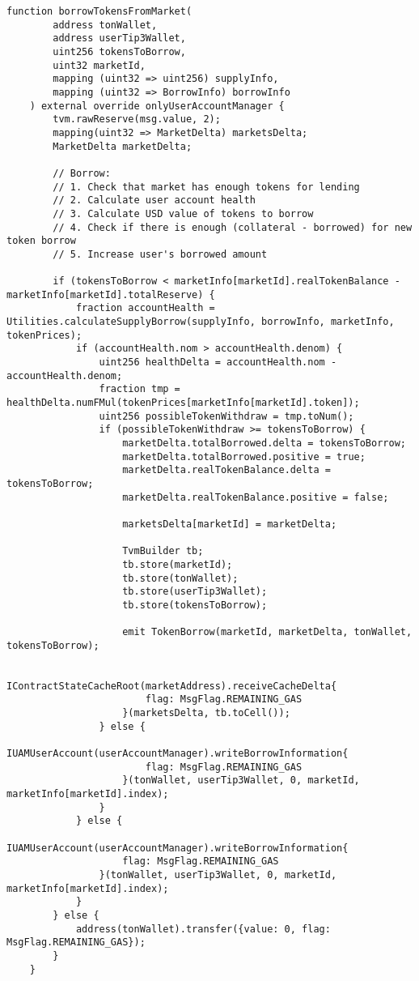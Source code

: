 \begin{lstlisting}[firstnumber=105]
    function borrowTokensFromMarket(
        address tonWallet,
        address userTip3Wallet,
        uint256 tokensToBorrow,
        uint32 marketId,
        mapping (uint32 => uint256) supplyInfo,
        mapping (uint32 => BorrowInfo) borrowInfo
    ) external override onlyUserAccountManager {
        tvm.rawReserve(msg.value, 2);
        mapping(uint32 => MarketDelta) marketsDelta;
        MarketDelta marketDelta;
        
        // Borrow:
        // 1. Check that market has enough tokens for lending
        // 2. Calculate user account health
        // 3. Calculate USD value of tokens to borrow
        // 4. Check if there is enough (collateral - borrowed) for new token borrow
        // 5. Increase user's borrowed amount

        if (tokensToBorrow < marketInfo[marketId].realTokenBalance - marketInfo[marketId].totalReserve) {
            fraction accountHealth = Utilities.calculateSupplyBorrow(supplyInfo, borrowInfo, marketInfo, tokenPrices);
            if (accountHealth.nom > accountHealth.denom) {
                uint256 healthDelta = accountHealth.nom - accountHealth.denom;
                fraction tmp = healthDelta.numFMul(tokenPrices[marketInfo[marketId].token]);
                uint256 possibleTokenWithdraw = tmp.toNum();
                if (possibleTokenWithdraw >= tokensToBorrow) {
                    marketDelta.totalBorrowed.delta = tokensToBorrow;
                    marketDelta.totalBorrowed.positive = true;
                    marketDelta.realTokenBalance.delta = tokensToBorrow;
                    marketDelta.realTokenBalance.positive = false;

                    marketsDelta[marketId] = marketDelta;

                    TvmBuilder tb;
                    tb.store(marketId);
                    tb.store(tonWallet);
                    tb.store(userTip3Wallet);
                    tb.store(tokensToBorrow);

                    emit TokenBorrow(marketId, marketDelta, tonWallet, tokensToBorrow);

                    IContractStateCacheRoot(marketAddress).receiveCacheDelta{
                        flag: MsgFlag.REMAINING_GAS
                    }(marketsDelta, tb.toCell());
                } else {
                    IUAMUserAccount(userAccountManager).writeBorrowInformation{
                        flag: MsgFlag.REMAINING_GAS
                    }(tonWallet, userTip3Wallet, 0, marketId, marketInfo[marketId].index);
                }
            } else {
                IUAMUserAccount(userAccountManager).writeBorrowInformation{
                    flag: MsgFlag.REMAINING_GAS
                }(tonWallet, userTip3Wallet, 0, marketId, marketInfo[marketId].index);
            }
        } else {
            address(tonWallet).transfer({value: 0, flag: MsgFlag.REMAINING_GAS});
        }
    }
\end{lstlisting}

